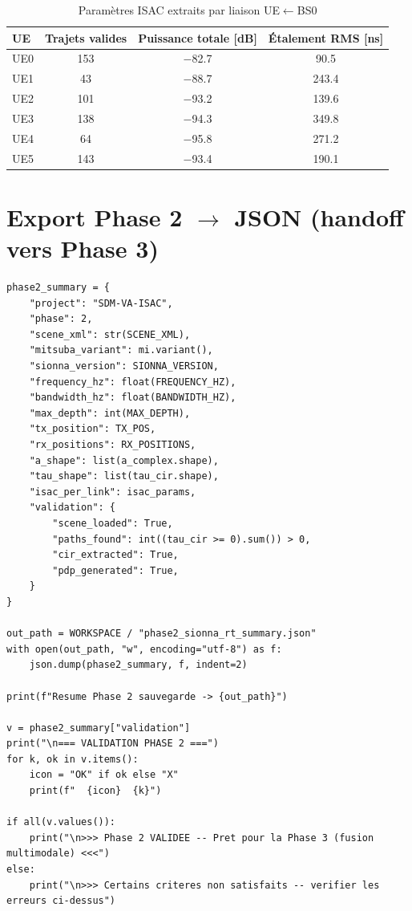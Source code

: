 \documentclass[11pt,a4paper]{article}
\begin{document}
\begin{table}[H]
\centering
\begin{tabular}{lccc}
\toprule
\textbf{UE} & \textbf{Trajets valides} & \textbf{Puissance totale [dB]} & \textbf{Étalement RMS [ns]} \\
\midrule
UE0 & 153 & $-$82.7 & 90.5 \\
UE1 & 43  & $-$88.7 & 243.4 \\
UE2 & 101 & $-$93.2 & 139.6 \\
UE3 & 138 & $-$94.3 & 349.8 \\
UE4 & 64  & $-$95.8 & 271.2 \\
UE5 & 143 & $-$93.4 & 190.1 \\
\bottomrule
\end{tabular}
\caption{Paramètres ISAC extraits par liaison UE$\leftarrow$BS0}
\label{tab:isac}
\end{table}

\section{Export Phase 2 \texorpdfstring{$\to$}{->} JSON (handoff vers Phase 3)}

\begin{lstlisting}
phase2_summary = {
    "project": "SDM-VA-ISAC",
    "phase": 2,
    "scene_xml": str(SCENE_XML),
    "mitsuba_variant": mi.variant(),
    "sionna_version": SIONNA_VERSION,
    "frequency_hz": float(FREQUENCY_HZ),
    "bandwidth_hz": float(BANDWIDTH_HZ),
    "max_depth": int(MAX_DEPTH),
    "tx_position": TX_POS,
    "rx_positions": RX_POSITIONS,
    "a_shape": list(a_complex.shape),
    "tau_shape": list(tau_cir.shape),
    "isac_per_link": isac_params,
    "validation": {
        "scene_loaded": True,
        "paths_found": int((tau_cir >= 0).sum()) > 0,
        "cir_extracted": True,
        "pdp_generated": True,
    }
}

out_path = WORKSPACE / "phase2_sionna_rt_summary.json"
with open(out_path, "w", encoding="utf-8") as f:
    json.dump(phase2_summary, f, indent=2)

print(f"Resume Phase 2 sauvegarde -> {out_path}")

v = phase2_summary["validation"]
print("\n=== VALIDATION PHASE 2 ===")
for k, ok in v.items():
    icon = "OK" if ok else "X"
    print(f"  {icon}  {k}")

if all(v.values()):
    print("\n>>> Phase 2 VALIDEE -- Pret pour la Phase 3 (fusion multimodale) <<<")
else:
    print("\n>>> Certains criteres non satisfaits -- verifier les erreurs ci-dessus")
\end{lstlisting}
\end{document}
